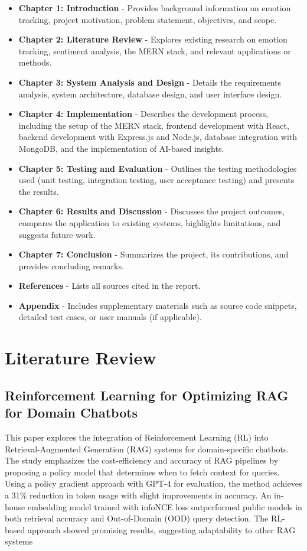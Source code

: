 \documentclass[12pt,a4paper]{report}
\begin{document}
\begin{itemize}
    \item \textbf{Chapter 1: Introduction} - Provides background information on emotion tracking, project motivation, problem statement, objectives, and scope.
    \item \textbf{Chapter 2: Literature Review} - Explores existing research on emotion tracking, sentiment analysis, the MERN stack, and relevant applications or methods.
    \item \textbf{Chapter 3: System Analysis and Design} - Details the requirements analysis, system architecture, database design, and user interface design.
    \item \textbf{Chapter 4: Implementation} - Describes the development process, including the setup of the MERN stack, frontend development with React, backend development with Express.js and Node.js, database integration with MongoDB, and the implementation of AI-based insights.
    \item \textbf{Chapter 5: Testing and Evaluation} - Outlines the testing methodologies used (unit testing, integration testing, user acceptance testing) and presents the results.
    \item \textbf{Chapter 6: Results and Discussion} - Discusses the project outcomes, compares the application to existing systems, highlights limitations, and suggests future work.
    \item \textbf{Chapter 7: Conclusion} - Summarizes the project, its contributions, and provides concluding remarks.
    \item \textbf{References} - Lists all sources cited in the report.
    \item \textbf{Appendix} - Includes supplementary materials such as source code snippets, detailed test cases, or user manuals (if applicable).
\end{itemize}

\chapter{Literature Review}

\section{Reinforcement Learning for Optimizing RAG for Domain Chatbots}

This paper explores the integration of Reinforcement Learning (RL) into Retrieval-Augmented Generation (RAG) systems for domain-specific chatbots. The study emphasizes the cost-efficiency and accuracy of RAG pipelines by proposing a policy model that determines when to fetch context for queries. Using a policy gradient approach with GPT-4 for evaluation, the method achieves a 31\% reduction in token usage with slight improvements in accuracy. An in-house embedding model trained with infoNCE loss outperformed public models in both retrieval accuracy and Out-of-Domain (OOD) query detection. The RL-based approach showed promising results, suggesting adaptability to other RAG systems
\end{document}
